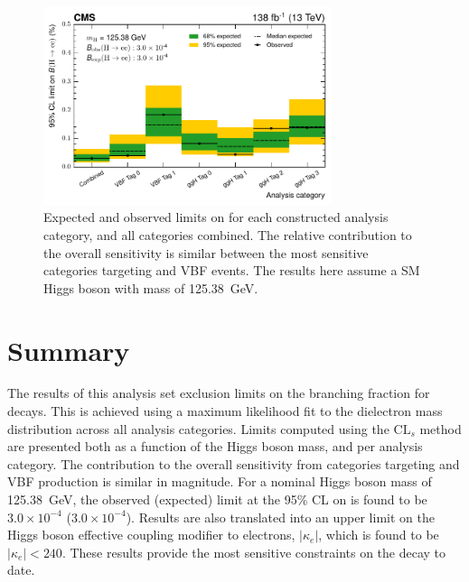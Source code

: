 \begin{figure}[htbp!]
\centering
\includegraphics[width=0.75\textwidth]{Figures/Hee/Results/limits/per_category_limits.pdf}\hfill%
\caption[Limits on \BHee per analysis category.]{Expected and observed limits on \BHee for each constructed analysis category, and all categories combined. The relative contribution to the overall sensitivity is similar between the most sensitive categories targeting \ggH and VBF events. The results here assume a SM Higgs boson with mass of 125.38~GeV. }
\label{fig:hee_limits_per_cat}
\end{figure}

\section{Summary}
\label{subsection:hee_s_b_models_summary}

The results of this analysis set exclusion limits on the branching fraction for \Hee decays. This is achieved using a maximum likelihood fit to the dielectron mass distribution across all analysis categories. Limits computed using the $\mathrm{CL}_s$ method are presented both as a function of the Higgs boson mass, and per analysis category. The contribution to the overall sensitivity from categories targeting \ggH and VBF production is similar in magnitude. For a nominal Higgs boson mass of 125.38~GeV, the observed (expected) limit at the 95\% CL on \BHee is found to be $3.0\times10^{-4}$ ($3.0\times10^{-4}$). Results are also translated into an upper limit on the Higgs boson effective coupling modifier to electrons, $|\kappa_{e}|$, which is found to be $|\kappa_{e}|<240$. These results provide the most sensitive constraints on the \Hee decay to date.